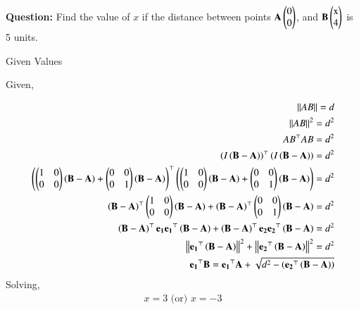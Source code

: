 \documentclass[journal]{IEEEtran}
\begin{document}

\vspace{3cm}

\title{}
\author{EE24BTECH11053 - S A Aravind Eswar
}
{\let\newpage\relax\maketitle}

\renewcommand{\thefigure}{\theenumi}
\renewcommand{\thetable}{\theenumi}
\setlength{\intextsep}{10pt} %


\renewcommand{\thetable}{\theenumi}

\textbf{Question:} Find the value of $x$ if the distance between points $\mathbf{A}\begin{pmatrix}0\\0\end{pmatrix}$, and $\vec{B}\myvec{$x$\\4}$ is 5 units.\\

\solution
\begin{table}[h]
	\centering
	
	\caption{Given Values}
	\label{tab:1}
\end{table}

Given,

\begin{align}\left\lVert{AB}\right\rVert = d\\\left\lVert{AB}\right\rVert^2 = d^2\\AB^\top AB = d^2\\\left(I\left(\mathbf{B}-\mathbf{A}\right)\right)^\top\left(I\left(\mathbf{B}-\mathbf{A}\right)\right)=d^2\\\left(\begin{pmatrix}1 & 0\\0 & 0\end{pmatrix}\left(\mathbf{B}-\mathbf{A}\right)+\begin{pmatrix}0 & 0\\0 & 1\end{pmatrix}\left(\mathbf{B}-\mathbf{A}\right)\right)^\top\left(\begin{pmatrix}1 & 0\\0 & 0\end{pmatrix}\left(\mathbf{B}-\mathbf{A}\right)+\begin{pmatrix}0 & 0\\0 & 1\end{pmatrix}\left(\mathbf{B}-\mathbf{A}\right)\right) = d^2\\\left(\mathbf{B}-\mathbf{A}\right)^\top\begin{pmatrix}1 & 0\\0 & 0\end{pmatrix}\left(\mathbf{B}-\mathbf{A}\right) + \left(\mathbf{B}-\mathbf{A}\right)^\top\begin{pmatrix}0 & 0\\0 & 1\end{pmatrix}\left(\mathbf{B}-\mathbf{A}\right) = d^2\\\left(\mathbf{B}-\mathbf{A}\right)^\top \mathbf{e_1} \mathbf{e_1}^\top\left(\mathbf{B}-\mathbf{A}\right) + \left(\mathbf{B}-\mathbf{A}\right)^\top\mathbf{e_2}\mathbf{e_2}^\top\left(\mathbf{B}-\mathbf{A}\right) = d^2\\\left\lVert\mathbf{e_1}^\top\left(\mathbf{B}-\mathbf{A}\right)\right\rVert^2 + \left\lVert\mathbf{e_2}^\top\left(\mathbf{B}-\mathbf{A}\right)\right\rVert^2 = d^2\\\mathbf{e_1}^\top\mathbf{B} = \mathbf{e_1}^\top\mathbf{A} + \sqrt{d^2 - \left(\mathbf{e_2}^\top\left(\mathbf{B}-\mathbf{A}\right)\right)}\end{align}
Solving,\\
	\begin{align}x = 3  \text{ (or) }  x = -3\end{align}
\end{document}
